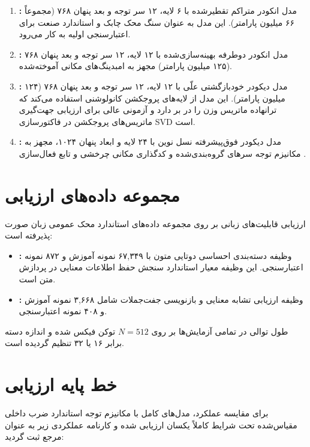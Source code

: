 \documentclass[12pt,a4paper]{report}
\theoremstyle{definition}
\begin{document}
\begin{enumerate}
    \item \textbf{:} مدل انکودر متراکم تقطیرشده با ۶ لایه، ۱۲ سر توجه و بعد پنهان ۷۶۸ (مجموعاً ۶۶ میلیون پارامتر). این مدل به عنوان سنگ محک چابک و استاندارد صنعت برای اعتبارسنجی اولیه به کار می‌رود.
    \item \textbf{:} مدل انکودر دوطرفه بهینه‌سازی‌شده با ۱۲ لایه، ۱۲ سر توجه و بعد پنهان ۷۶۸ (۱۲۵ میلیون پارامتر) مجهز به امبدینگ‌های مکانی آموخته‌شده.
    \item \textbf{:} مدل دیکودر خودبازگشتی علّی با ۱۲ لایه، ۱۲ سر توجه و بعد پنهان ۷۶۸ (۱۲۴ میلیون پارامتر). این مدل از لایه‌های پروجکشن کانولوشنی  استفاده می‌کند که ترانهاده ماتریس وزن را در بر دارد و آزمونی عالی برای ارزیابی جهت‌گیری ماتریس‌های پروجکشن در فاکتورسازی SVD است.
    \item \textbf{:} مدل دیکودر فوق‌پیشرفته نسل نوین با ۲۴ لایه و ابعاد پنهان ۱۰۲۴، مجهز به مکانیزم توجه سرهای گروه‌بندی‌شده  و کدگذاری مکانی چرخشی  و تابع فعال‌سازی .
\end{enumerate}

\section{مجموعه داده‌های ارزیابی }
ارزیابی قابلیت‌های زبانی بر روی مجموعه داده‌های استاندارد محک عمومی زبان  صورت پذیرفته است:
\begin{itemize}
    \item \textbf{:} وظیفه دسته‌بندی احساسی دوتایی متون با ۶۷,۳۴۹ نمونه آموزش و ۸۷۲ نمونه اعتبارسنجی. این وظیفه معیار استاندارد سنجش حفظ اطلاعات معنایی در پردازش متن است.
    \item \textbf{:} وظیفه ارزیابی تشابه معنایی و بازنویسی جفت‌جملات شامل ۳,۶۶۸ نمونه آموزش و ۴۰۸ نمونه اعتبارسنجی.
\end{itemize}
طول توالی در تمامی آزمایش‌ها بر روی $N=512$ توکن فیکس شده و اندازه دسته  برابر ۱۶ یا ۳۲ تنظیم گردیده است.

\section{خط پایه ارزیابی }
برای مقایسه عملکرد، مدل‌های کامل با مکانیزم توجه استاندارد ضرب داخلی مقیاس‌شده  تحت شرایط کاملاً یکسان ارزیابی شده و کارنامه عملکردی زیر به عنوان مرجع ثبت گردید:
\end{document}

